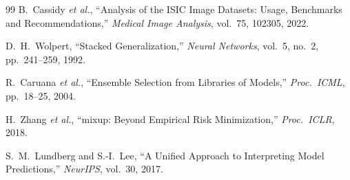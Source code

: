 \documentclass[conference]{IEEEtran}
\begin{document}
\begin{thebibliography}{99}
B.~Cassidy \emph{et al.},
``Analysis of the ISIC Image Datasets: Usage, Benchmarks and
Recommendations,''
\emph{Medical Image Analysis}, vol.~75, 102305, 2022.

D.~H.~Wolpert,
``Stacked Generalization,''
\emph{Neural Networks}, vol.~5, no.~2, pp.~241--259, 1992.

R.~Caruana \emph{et al.},
``Ensemble Selection from Libraries of Models,''
\emph{Proc.\ ICML}, pp.~18--25, 2004.

H.~Zhang \emph{et al.},
``mixup: Beyond Empirical Risk Minimization,''
\emph{Proc.\ ICLR}, 2018.

S.~M.~Lundberg and S.-I.~Lee,
``A Unified Approach to Interpreting Model Predictions,''
\emph{NeurIPS}, vol.~30, 2017.

\end{thebibliography}
\end{document}
